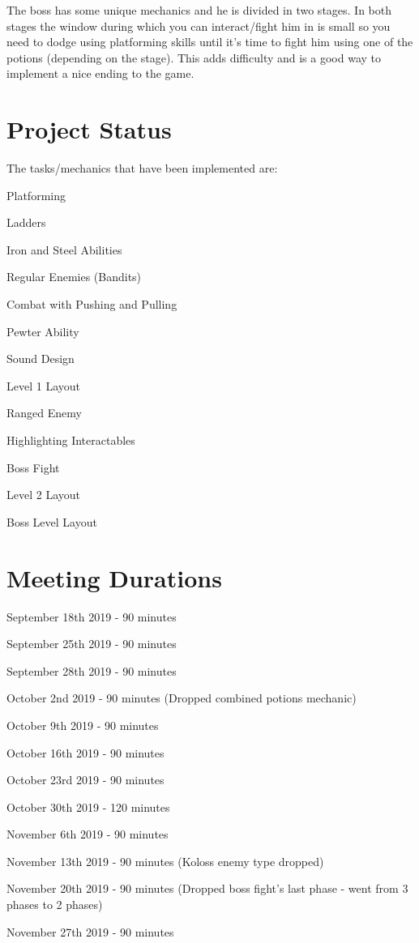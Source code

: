 \documentclass{article}
\begin{document}
The boss has some unique mechanics and he is divided in two stages. In both stages the window during which you can interact/fight him in is small so you need to dodge using platforming skills until it's time to fight him using one of the potions (depending on the stage). This adds difficulty and is a good way to implement a nice ending to the game.


\section{Project Status}
The tasks/mechanics that have been implemented are:
\begin{description}
	\item Platforming
	\item Ladders
	\item Iron and Steel Abilities
	\item Regular Enemies (Bandits)
	\item Combat with Pushing and Pulling
	\item Pewter Ability
	\item Sound Design
	\item Level 1 Layout
	\item Ranged Enemy
	\item Highlighting Interactables
	\item Boss Fight
	\item Level 2 Layout
	\item Boss Level Layout
	\end{description}

\section{Meeting Durations}
\begin{description}
	\item September 18th 2019 - 90 minutes 
	\item September 25th 2019 - 90 minutes
	\item September 28th 2019 - 90 minutes
	\item October 2nd 2019 - 90 minutes (Dropped combined potions mechanic)
	\item October 9th 2019 - 90 minutes
	\item October 16th 2019 - 90 minutes
	\item October 23rd 2019 - 90 minutes
	\item October 30th 2019 - 120 minutes
	\item November 6th 2019 - 90 minutes
	\item November 13th 2019 - 90 minutes (Koloss enemy type dropped)
	\item November 20th 2019 - 90 minutes (Dropped boss fight's last phase - went from 3 phases to 2 phases)
	\item November 27th 2019 - 90 minutes
	\end{description}
\end{document}
